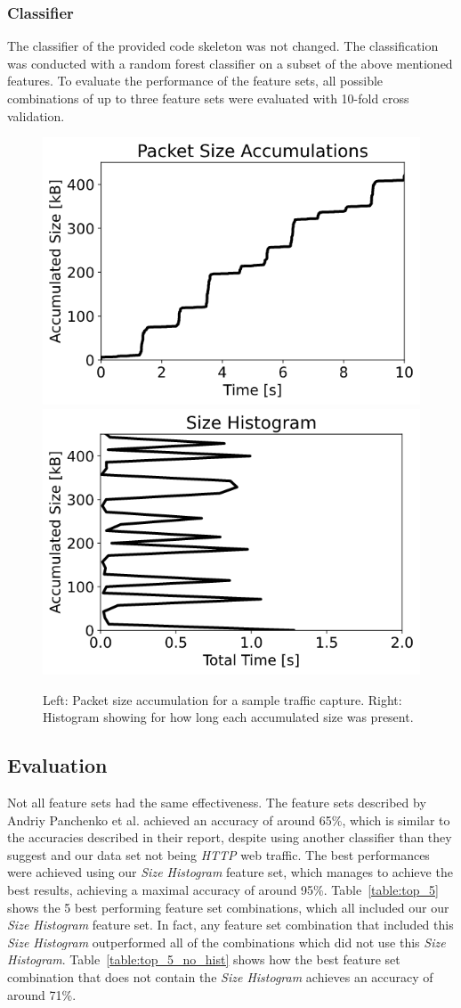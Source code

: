 \documentclass[9pt,conference]{IEEEtran}
\begin{document}
\subsubsection{Classifier}
The classifier of the provided code skeleton was not changed. The classification was conducted with a random forest classifier on a subset of the above mentioned features. To evaluate the performance of the feature sets, all possible combinations of up to three feature sets were evaluated with 10-fold cross validation.

\begin{figure}
    \centering
    \includegraphics[width=0.45\linewidth]{images/size_accums.png}
    \includegraphics[width=0.45\linewidth]{images/histogram.png}
    \caption{Left: Packet size accumulation for a sample traffic capture. Right: Histogram showing for how long each accumulated size was present.}
    \label{fig:features}
\end{figure}

\subsection{Evaluation}
Not all feature sets had the same effectiveness. The feature sets described by Andriy Panchenko et al.\cite{panchenko2011website} achieved an accuracy of around 65\%, which is similar to the accuracies described in their report, despite using another classifier than they suggest and our data set not being \textit{HTTP} web traffic. The best performances were achieved using our \textit{Size Histogram} feature set, which manages to achieve the best results, achieving a maximal accuracy of around 95\%. Table~\ref{table:top_5} shows the 5 best performing feature set combinations, which all included our our \textit{Size Histogram} feature set. In fact, any feature set combination that included this \textit{Size Histogram} outperformed all of the combinations which did not use this \textit{Size Histogram}. Table~\ref{table:top_5_no_hist} shows how the best feature set combination that does not contain the \textit{Size Histogram} achieves an accuracy of around 71\%.
\end{document}
